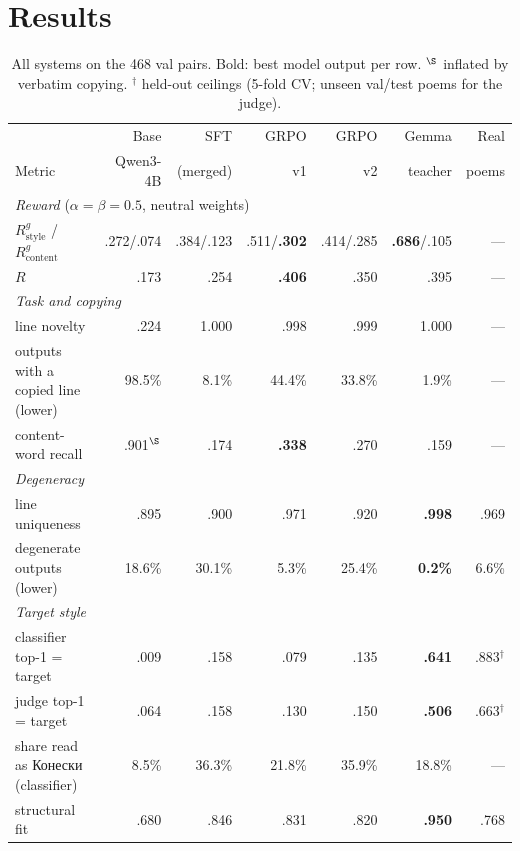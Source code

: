 \documentclass[11pt]{article}
\begin{document}
\section{Results}\label{sec:results}

\begin{table}[ht]
\centering\small
\begin{tabular}{lrrrrrr}
\toprule
& Base & SFT & GRPO & GRPO & Gemma & Real \\
Metric & Qwen3-4B & (merged) & v1 & v2 & teacher & poems \\
\midrule
\multicolumn{7}{l}{\emph{Reward} ($\alpha=\beta=0.5$, neutral weights)} \\
\quad $R^{g}_{\mathrm{style}}$ / $R^{g}_{\mathrm{content}}$ & .272/.074 & .384/.123 & .511/\textbf{.302} & .414/.285 & \textbf{.686}/.105 & --- \\
\quad $R$                                   & .173 & .254 & \textbf{.406} & .350 & .395 & --- \\
\midrule
\multicolumn{7}{l}{\emph{Task and copying}} \\
\quad line novelty                          & .224 & 1.000 & .998 & .999 & 1.000 & --- \\
\quad outputs with a copied line (lower)    & 98.5\% & 8.1\% & 44.4\% & 33.8\% & 1.9\% & --- \\
\quad content-word recall                   & .901$^\S$ & .174 & \textbf{.338} & .270 & .159 & --- \\
\midrule
\multicolumn{7}{l}{\emph{Degeneracy}} \\
\quad line uniqueness                       & .895 & .900 & .971 & .920 & \textbf{.998} & .969 \\
\quad degenerate outputs (lower)            & 18.6\% & 30.1\% & 5.3\% & 25.4\% & \textbf{0.2\%} & 6.6\% \\
\midrule
\multicolumn{7}{l}{\emph{Target style}} \\
\quad classifier top-1 = target             & .009 & .158 & .079 & .135 & \textbf{.641} & .883$^\dagger$ \\
\quad judge top-1 = target                  & .064 & .158 & .130 & .150 & \textbf{.506} & .663$^\dagger$ \\
\quad share read as Конески (classifier)    & 8.5\% & 36.3\% & 21.8\% & 35.9\% & 18.8\% & --- \\
\quad structural fit                        & .680 & .846 & .831 & .820 & \textbf{.950} & .768 \\
\bottomrule
\end{tabular}
\caption{All systems on the 468 val pairs. Bold: best model output per row.
$^\S$ inflated by verbatim copying. $^\dagger$ held-out ceilings (5-fold CV;
unseen val/test poems for the judge).}
\label{tab:main}
\end{table}
\end{document}

